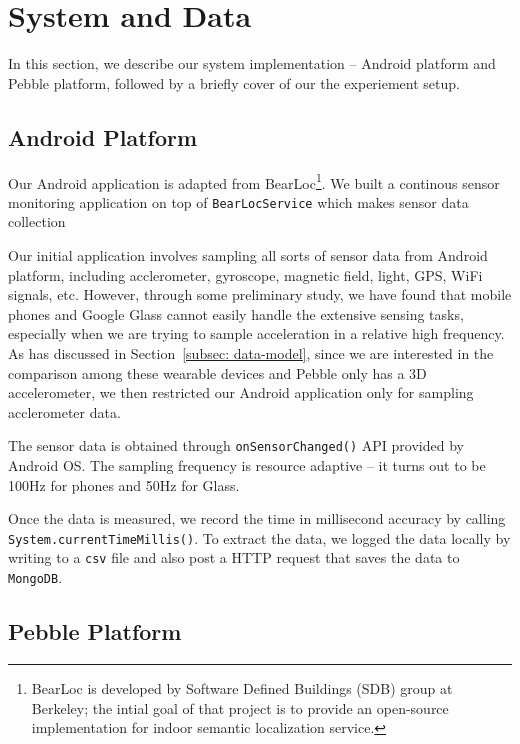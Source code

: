 \section{System and Data}
\label{sec:system-data}

In this section, we describe our system implementation -- Android platform and Pebble platform, followed by a briefly cover of our the experiement setup.

\subsection{Android Platform}
\label{sec:android-platform}

Our Android application is adapted from BearLoc\footnote{BearLoc is developed by Software Defined Buildings (SDB) group at Berkeley; the intial goal of that project is to provide an open-source implementation for indoor semantic localization service.}. We built a continous sensor monitoring application on top of \texttt{BearLocService} which makes sensor data collection

Our initial application involves sampling all sorts of sensor data from Android platform, including acclerometer, gyroscope, magnetic field, light, GPS, WiFi signals, etc. However, through some preliminary study, we have found that mobile phones and Google Glass cannot easily handle the extensive sensing tasks, especially when we are trying to sample acceleration in a relative high frequency. As has discussed in Section~\ref{subsec: data-model}, since we are interested in the comparison among these wearable devices and Pebble only has a 3D accelerometer, we then restricted our Android application only for sampling acclerometer data.

The sensor data is obtained through \texttt{onSensorChanged()} API provided by Android OS. The sampling frequency is resource adaptive -- it turns out to be 100Hz for phones and 50Hz for Glass. 

Once the data is measured, we record the time in millisecond accuracy by calling \texttt{System.currentTimeMillis()}. To extract the data, we logged the data locally by writing to a \texttt{csv} file and also post a HTTP request that saves the data to \texttt{MongoDB}.

\subsection{Pebble Platform}
\label{sec:pebble-platform}

